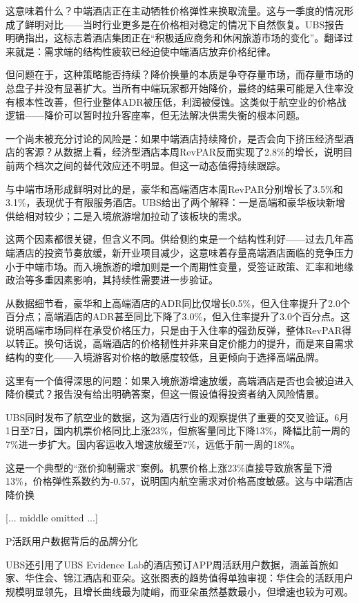 \documentclass[11pt]{ctexart}
\begin{document}
这意味着什么？中端酒店正在主动牺牲价格弹性来换取流量。这与一季度的情况形成了鲜明对比——当时行业更多是在价格相对稳定的情况下自然恢复。UBS报告明确指出，这标志着酒店集团正在“积极适应商务和休闲旅游市场的变化”。翻译过来就是：需求端的结构性疲软已经迫使中端酒店放弃价格纪律。

但问题在于，这种策略能否持续？降价换量的本质是争夺存量市场，而存量市场的总盘子并没有显著扩大。当所有中端玩家都开始降价，最终的结果可能是入住率没有根本性改善，但行业整体ADR被压低，利润被侵蚀。这类似于航空业的价格战逻辑——降价可以暂时拉升客座率，但无法解决供需失衡的根本问题。

一个尚未被充分讨论的风险是：如果中端酒店持续降价，是否会向下挤压经济型酒店的客源？从数据上看，经济型酒店本周RevPAR反而实现了2.8\%的增长，说明目前两个档次之间的替代效应还不明显。但这一动态值得持续跟踪。

与中端市场形成鲜明对比的是，豪华和高端酒店本周RevPAR分别增长了3.5\%和3.1\%，表现优于有限服务酒店。UBS给出了两个解释：一是高端和豪华板块新增供给相对较少；二是入境旅游增加拉动了该板块的需求。

这两个因素都很关键，但含义不同。供给侧约束是一个结构性利好——过去几年高端酒店的投资节奏放缓，新开业项目减少，这意味着存量高端酒店面临的竞争压力小于中端市场。而入境旅游的增加则是一个周期性变量，受签证政策、汇率和地缘政治等多重因素影响，其持续性需要进一步验证。

从数据细节看，豪华和上高端酒店的ADR同比仅增长0.5\%，但入住率提升了2.0个百分点；高端酒店的ADR甚至同比下降了3.0\%，但入住率提升了3.0个百分点。这说明高端市场同样在承受价格压力，只是由于入住率的强劲反弹，整体RevPAR得以转正。换句话说，高端酒店的价格韧性并非来自定价能力的提升，而是来自需求结构的变化——入境游客对价格的敏感度较低，且更倾向于选择高端品牌。

这里有一个值得深思的问题：如果入境旅游增速放缓，高端酒店是否也会被迫进入降价模式？报告没有给出明确答案，但这一假设值得投资者纳入风险情景。

UBS同时发布了航空业的数据，这为酒店行业的观察提供了重要的交叉验证。6月1日至7日，国内机票价格同比上涨23\%，但旅客量同比下降13\%，降幅比前一周的7\%进一步扩大。国内客运收入增速放缓至7\%，远低于前一周的18\%。

这是一个典型的“涨价抑制需求”案例。机票价格上涨23\%直接导致旅客量下滑13\%，价格弹性系数约为-0.57，说明国内航空需求对价格高度敏感。这与中端酒店降价换

[... middle omitted ...]

P活跃用户数据背后的品牌分化

UBS还引用了UBS Evidence Lab的酒店预订APP周活跃用户数据，涵盖首旅如家、华住会、锦江酒店和亚朵。这张图表的趋势值得单独审视：华住会的活跃用户规模明显领先，且增长曲线最为陡峭，而亚朵虽然基数最小，但增速也较为可观。
\end{document}
